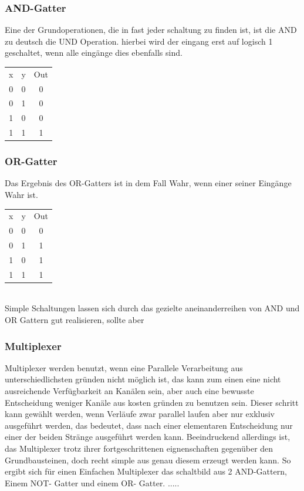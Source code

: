 \documentclass[conference]{IEEEtran}
\begin{document}
\subsubsection{AND-Gatter}
Eine der Grundoperationen, die in fast jeder schaltung zu finden ist, ist die AND zu deutsch die UND Operation. hierbei wird der eingang erst auf logisch 1 geschaltet, wenn alle eingänge dies ebenfalls sind.\\
\begin{tabular}[h]{ccc}
x&y&Out\\
0&0&0\\
0&1&0\\
1&0&0\\
1&1&1\\
\end{tabular}
\subsubsection{OR-Gatter}
Das Ergebnis des OR-Gatters ist in dem Fall Wahr, wenn einer seiner Eingänge Wahr ist.\\
\begin{tabular}[h]{ccc}
x&y&Out\\
0&0&0\\
0&1&1\\
1&0&1\\
1&1&1\\
\end{tabular}
\\Simple Schaltungen lassen sich durch das gezielte aneinanderreihen von AND und OR Gattern gut realisieren, sollte aber 
\subsubsection{Multiplexer}
Multiplexer werden benutzt, wenn eine Parallele Verarbeitung aus unterschiedlichsten gründen nicht möglich ist, das kann zum einen eine nicht ausreichende Verfügbarkeit an Kanälen sein, aber auch eine bewusste Entscheidung weniger Kanäle aus kosten gründen zu benutzen sein. Dieser schritt kann gewählt werden, wenn Verläufe zwar parallel laufen aber nur exklusiv ausgeführt werden, das bedeutet, dass nach einer elementaren Entscheidung nur einer der beiden Stränge ausgeführt werden kann. Beeindruckend allerdings ist, das Multiplexer trotz ihrer fortgeschrittenen eignenschaften gegenüber den Grundbausteinen, doch recht simple aus genau diesem erzeugt werden kann. So ergibt sich für einen Einfachen Multiplexer das schaltbild aus 2 AND-Gattern, Einem NOT- Gatter und einem OR- Gatter. .....
\end{document}
